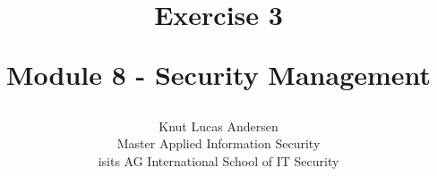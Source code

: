 \title{ 
	\begin{center} \textbf{ Exercise 3 } \end{center}
	\begin{center} {\large Module 8 - Security Management } \end{center}
}

\author{ 
	Knut Lucas Andersen \\
	Master Applied Information Security \\
	isits AG International School of IT Security
}